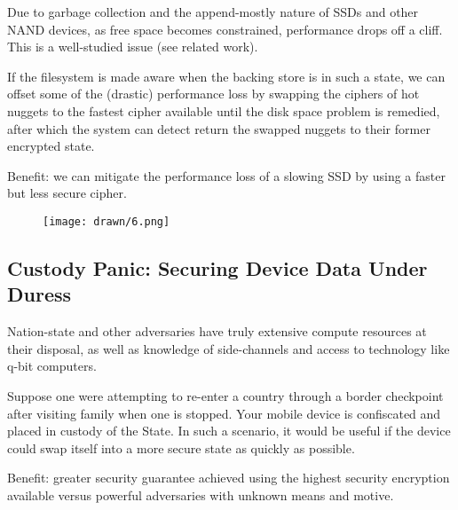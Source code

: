 Due to garbage collection and the append-mostly nature of SSDs and other NAND
devices, as free space becomes constrained, performance drops off a cliff. This
is a well-studied issue (see related work).

If the filesystem is made aware when the backing store is in such a state, we
can offset some of the (drastic) performance loss by swapping the ciphers of hot
nuggets to the fastest cipher available until the disk space problem is
remedied, after which the system can detect return the swapped nuggets to their
former encrypted state.

Benefit: we can mitigate the performance loss of a slowing SSD by using a faster
but less secure cipher.

\begin{figure}[ht]
 \centering
  \texttt{[image: drawn/6.png]}
   \caption{}\label{fig:eol}
\end{figure}

\subsection{Custody Panic: Securing Device Data Under Duress}

Nation-state and other adversaries have truly extensive compute resources at
their disposal, as well as knowledge of side-channels and access to technology
like q-bit computers.

Suppose one were attempting to re-enter a country through a border checkpoint
after visiting family when one is stopped. Your mobile device is confiscated and
placed in custody of the State. In such a scenario, it would be useful if the
device could swap itself into a more secure state as quickly as possible.

Benefit: greater security guarantee achieved using the highest security
encryption available versus powerful adversaries with unknown means and motive.


